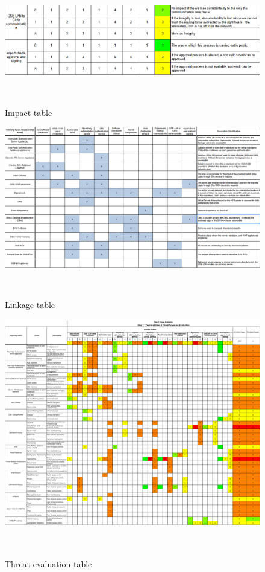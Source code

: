 \begin{figure}[h!]
    \centering
    \includegraphics[keepaspectratio,width=1\textwidth]{03-risk-analysis/002-SAIV/img/cut2Impa.png}
    \caption{Impact table}~\label{fig:impact2}
\end{figure}

\begin{figure}[h!]
    \centering
    \includegraphics[keepaspectratio,width=1\textwidth]{03-risk-analysis/002-SAIV/img/linkage.png}
    \caption{Linkage table}~\label{fig:linkage}
\end{figure}

\begin{figure}[h!]
    \centering
    \includegraphics[keepaspectratio,width=1\textwidth]{03-risk-analysis/003-TE/img/threatEval.pdf}
    \caption{Threat evaluation table}~\label{fig:threatsEval}
\end{figure}

